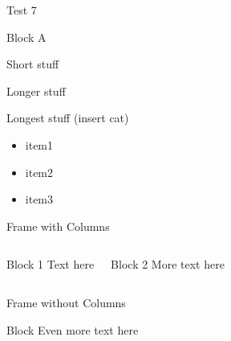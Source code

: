 \documentclass[t]{beamer}
\begin{document}
	 \begin{frame}{Test 7}
            
         	\begin{block}{Block A}
            
                \begin{description}
                    \item[short] Short stuff
                    \item[long] Longer stuff
                    \item[longest label] Longest stuff (insert cat)
                \end{description}
            
                \begin{itemize}
                    \item item1
                    \item item2
                    \item item3
                \end{itemize}  
            \end{block}

        \end{frame}

        \begin{frame}[t]{Frame with Columns}
            \begin{columns}[t]

                \begin{block}{Block 1}
                    Text here
                \end{block}


                \begin{block}{Block 2}
                    More text here
                \end{block}
            \end{columns}
        \end{frame}

        \begin{frame}[t]{Frame without Columns}
            \leavevmode
            \begin{block}{Block}
                Even more text here
            \end{block}
        \end{frame}
	
\end{document}
